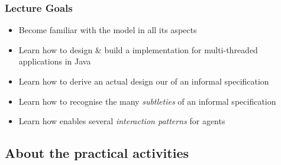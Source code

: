 \documentclass[presentation]{beamer}\mode<presentation>{\usetheme{AMSCesenaPurpleAndGold}}
\begin{document}
\begin{frame}
	\frametitle{Lecture Goals}
	
	\begin{itemize}
		
		\item Become familiar with the \linda{} model in all its aspects
		
		\vfill
		
		\item Learn how to \alert{design \& build} a \linda{} implementation for multi-threaded applications in Java
		
		\vfill
		
		\item Learn how to derive an actual design our of an informal specification
		
		\vfill
		
		\item Learn how to recognise the many \emph{subtleties} of an informal specification
		
		\vfill
		
		\item Learn how \linda{} enables several \emph{interaction patterns} for agents
		
	\end{itemize}

\end{frame}

\subsection{About the practical activities}
\end{document}
